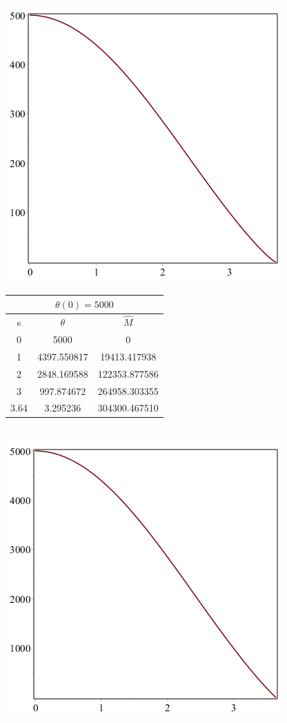 \documentclass[11pt]{article} %
\begin{document}
\includegraphics[scale=.5]{plots/wd5.png}\\
\begin{tabular}{ | c c c |}
\multicolumn{3}{c}{ $\theta(0) = 5000$ } \\
\hline
s & $\theta$ & $\hat M$\\
\hline
0 & 5000 & 0\\
1 &4397.550817&19413.417938\\
2 &2848.169588&122353.877586\\
3 & 997.874672& 264958.303355\\
3.64 &3.295236 &304300.467510\\
\hline
\end{tabular}\\
\includegraphics[scale=.5]{plots/wd6.png}\\
\end{document}
